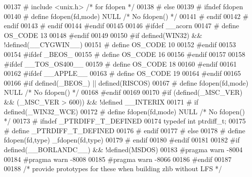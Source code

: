 \begin{DoxyCode}
00137 \textcolor{preprocessor}{#      include <unix.h>} \textcolor{comment}{/* for fdopen */}
00138 \textcolor{preprocessor}{#    else}
00139 \textcolor{preprocessor}{#      ifndef fdopen}
00140 \textcolor{preprocessor}{#        define fdopen(fd,mode) NULL }\textcolor{comment}{/* No fdopen() */}\textcolor{preprocessor}{}
00141 \textcolor{preprocessor}{#      endif}
00142 \textcolor{preprocessor}{#    endif}
00143 \textcolor{preprocessor}{#  endif}
00144 \textcolor{preprocessor}{#endif}
00145 
00146 \textcolor{preprocessor}{#ifdef \_\_acorn}
00147 \textcolor{preprocessor}{#  define OS\_CODE 13}
00148 \textcolor{preprocessor}{#endif}
00149 
00150 \textcolor{preprocessor}{#if defined(WIN32) && !defined(\_\_CYGWIN\_\_)}
00151 \textcolor{preprocessor}{#  define OS\_CODE  10}
00152 \textcolor{preprocessor}{#endif}
00153 
00154 \textcolor{preprocessor}{#ifdef \_BEOS\_}
00155 \textcolor{preprocessor}{#  define OS\_CODE  16}
00156 \textcolor{preprocessor}{#endif}
00157 
00158 \textcolor{preprocessor}{#ifdef \_\_TOS\_OS400\_\_}
00159 \textcolor{preprocessor}{#  define OS\_CODE 18}
00160 \textcolor{preprocessor}{#endif}
00161 
00162 \textcolor{preprocessor}{#ifdef \_\_APPLE\_\_}
00163 \textcolor{preprocessor}{#  define OS\_CODE 19}
00164 \textcolor{preprocessor}{#endif}
00165 
00166 \textcolor{preprocessor}{#if defined(\_BEOS\_) || defined(RISCOS)}
00167 \textcolor{preprocessor}{#  define fdopen(fd,mode) NULL }\textcolor{comment}{/* No fdopen() */}\textcolor{preprocessor}{}
00168 \textcolor{preprocessor}{#endif}
00169 
00170 \textcolor{preprocessor}{#if (defined(\_MSC\_VER) && (\_MSC\_VER > 600)) && !defined \_\_INTERIX}
00171 \textcolor{preprocessor}{#  if defined(\_WIN32\_WCE)}
00172 \textcolor{preprocessor}{#    define fdopen(fd,mode) NULL }\textcolor{comment}{/* No fdopen() */}\textcolor{preprocessor}{}
00173 \textcolor{preprocessor}{#    ifndef \_PTRDIFF\_T\_DEFINED}
00174        \textcolor{keyword}{typedef} \textcolor{keywordtype}{int} ptrdiff\_t;
00175 \textcolor{preprocessor}{#      define \_PTRDIFF\_T\_DEFINED}
00176 \textcolor{preprocessor}{#    endif}
00177 \textcolor{preprocessor}{#  else}
00178 \textcolor{preprocessor}{#    define fdopen(fd,type)  \_fdopen(fd,type)}
00179 \textcolor{preprocessor}{#  endif}
00180 \textcolor{preprocessor}{#endif}
00181 
00182 \textcolor{preprocessor}{#if defined(\_\_BORLANDC\_\_) && !defined(MSDOS)}
00183 \textcolor{preprocessor}{  #pragma warn -8004}
00184 \textcolor{preprocessor}{  #pragma warn -8008}
00185 \textcolor{preprocessor}{  #pragma warn -8066}
00186 \textcolor{preprocessor}{#endif}
00187 
00188 \textcolor{comment}{/* provide prototypes for these when building zlib without LFS */}

\end{DoxyCode}
